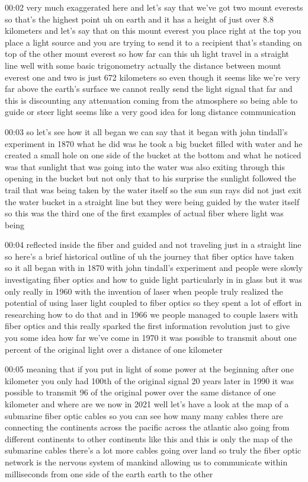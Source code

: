00:02
very much exaggerated here and let's say that we've got
two mount everests so that's the highest point
uh on earth and it has a height of just over 8.8 kilometers and let's say that
on this mount everest you place right at the top you place
a light source and you are trying to send it
to a recipient that's standing on top of the other mount everest
so how far can this uh light travel in a straight line
well with some basic trigonometry actually the distance between
mount everest one and two is just 672 kilometers
so even though it seems like we're very far above the earth's surface
we cannot really send the light signal that far and this is discounting
any attenuation coming from the atmosphere so being able to guide or steer light
seems like a very good idea for long distance communication

00:03
so let's see how it all began we can say that it began with john tindall's
experiment in 1870 what he did was he took a big bucket filled with water
and he created a small hole on one side of the bucket at the bottom
and what he noticed was that sunlight that was going into the water
was also exiting through this opening in the bucket
but not only that to his surprise the sunlight followed
the trail that was being taken by the water itself
so the sun sun rays did not just exit the water bucket in a straight line but
they were being guided by the water itself so this was
the third one of the first examples of actual fiber where light was being

00:04
reflected inside the fiber and guided and not traveling just in a straight line
so here's a brief historical outline of uh
the journey that fiber optics have taken so it all began with in 1870
with john tindall's experiment and people were slowly
investigating fiber optics and how to guide light particularly in in glass
but it was only really in 1960 with the invention of laser when people
truly realized the potential of using laser light coupled to fiber optics
so they spent a lot of effort in researching how to do that and in 1966
we people managed to couple lasers with fiber optics
and this really sparked the first information
revolution just to give you some idea how far we've come
in 1970 it was possible to transmit about one percent
of the original light over a distance of one kilometer

00:05
meaning that if you put in light of some power at the beginning after one
kilometer you only had 100th of the original signal
20 years later in 1990 it was possible to transmit 96 of the original power
over the same distance of one kilometer and where are we now in 2021 well
let's have a look at the map of a submarine
fiber optic cables so you can see how many many cables there are connecting
the continents across the pacific across the atlantic
also going from different continents to other continents like this
and this is only the map of the submarine cables
there's a lot more cables going over land
so truly the fiber optic network is the nervous system
of mankind allowing us to communicate within milliseconds
from one side of the earth earth to the other

